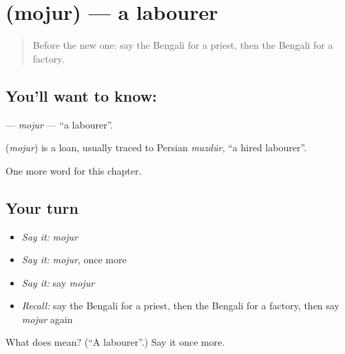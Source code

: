 \section[\texorpdfstring{\bn{মজুর} (mojur)}{মজুর (mojur)}]{ (mojur) — a labourer}

\label{lesson:BN-C127-mojur}



\begin{quote}
Before the new one: say the Bengali for a priest, then the Bengali for a factory.
\end{quote}

\subsection*{You'll want to know: }
\textbf{} — \emph{mojur} — \textquotedblleft{}a labourer\textquotedblright{}.

\begin{cousinweb}
\textbf{} (\emph{mojur}) is a loan, usually traced to Persian \emph{muzdūr}, \textquotedblleft{}a hired labourer\textquotedblright{}.
\end{cousinweb}

\begin{grammarlens}[title={What you've built}]
One more word for this chapter.
\end{grammarlens}

\subsection*{Your turn}
\begin{itemize}
\raggedright
  \item \emph{Say it:} \emph{mojur}
  \item \emph{Say it:} \emph{mojur}, once more
  \item \emph{Say it:} say \emph{mojur}
  \item \emph{Recall:} say the Bengali for a priest, then the Bengali for a factory, then say \emph{mojur} again
\end{itemize}

\begin{tcolorbox}[breakable,colback=teal!4,colframe=teal!35!black,title={Before you move on}]
What does  mean? (\textquotedblleft{}A labourer\textquotedblright{}.) Say it once more.
\end{tcolorbox}
